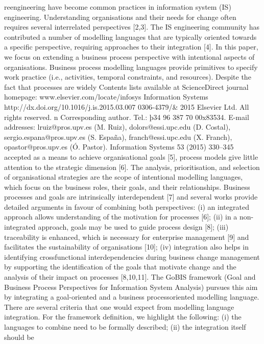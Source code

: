 reengineering have become common practices in information
system (IS) engineering. Understanding organisations and
their needs for change often requires several interrelated
perspectives [2,3]. The IS engineering community has contributed a number of modelling languages that are typically
oriented towards a specific perspective, requiring approaches
to their integration [4].
In this paper, we focus on extending a business process
perspective with intentional aspects of organisations. Business process modelling languages provide primitives to
specify work practice (i.e., activities, temporal constraints,
and resources). Despite the fact that processes are widely
Contents lists available at ScienceDirect
journal homepage: www.elsevier.com/locate/infosys
Information Systems
http://dx.doi.org/10.1016/j.is.2015.03.007
0306-4379/& 2015 Elsevier Ltd. All rights reserved.
n
Corresponding author. Tel.: þ34 96 387 70 00x83534.
E-mail addresses: lruiz@pros.upv.es (M. Ruiz),
dolors@essi.upc.edu (D. Costal), sergio.espana@pros.upv.es (S. España),
franch@essi.upc.edu (X. Franch), opastor@pros.upv.es (Ó. Pastor).
Information Systems 53 (2015) 330–345
accepted as a means to achieve organisational goals [5],
process models give little attention to the strategic dimension [6]. The analysis, prioritisation, and selection of organisational strategies are the scope of intentional modelling
languages, which focus on the business roles, their goals,
and their relationships.
Business processes and goals are intrinsically interdependent [7] and several works provide detailed arguments
in favour of combining both perspectives: (i) an integrated
approach allows understanding of the motivation for
processes [6]; (ii) in a non-integrated approach, goals
may be used to guide process design [8]; (iii) traceability
is enhanced, which is necessary for enterprise management [9] and facilitates the sustainability of organisations
[10]; (iv) integration also helps in identifying crossfunctional interdependencies during business change
management by supporting the identification of the goals
that motivate change and the analysis of their impact on
processes [8,10,11].
The GoBIS framework (Goal and Business Process
Perspectives for Information System Analysis) pursues this
aim by integrating a goal-oriented and a business processoriented modelling language. There are several criteria
that one would expect from modelling language integration. For the framework definition, we highlight the
following: (i) the languages to combine need to be
formally described; (ii) the integration itself should be
